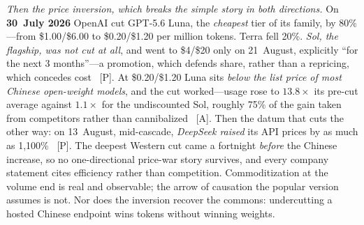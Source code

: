 \emph{Then the price inversion, which breaks the simple story in both directions.} On \textbf{30~July 2026} OpenAI cut GPT-5.6 Luna, the \emph{cheapest} tier of its family, by 80\%---from \$1.00/\$6.00 to \$0.20/\$1.20 per million tokens. Terra fell 20\%. \emph{Sol, the flagship, was not cut at all}, and went to \$4/\$20 only on 21~August, explicitly ``for the next 3 months''---a promotion, which defends share, rather than a repricing, which concedes cost~\cite{openai-luna} [P]. At \$0.20/\$1.20 Luna sits \emph{below the list price of most Chinese open-weight models}, and the cut worked---usage rose to $13.8\times$ its pre-cut average against $1.1\times$ for the undiscounted Sol, roughly 75\% of the gain taken from competitors rather than cannibalized~\cite{price-inversion,openrouter-aug26} [A]. Then the datum that cuts the other way: on 13~August, mid-cascade, \emph{DeepSeek raised} its API prices by as much as 1{,}100\%~\cite{deepseek-raise} [P]. The deepest Western cut came a fortnight \emph{before} the Chinese increase, so no one-directional price-war story survives, and every company statement cites efficiency rather than competition. Commoditization at the volume end is real and observable; the arrow of causation the popular version assumes is not. Nor does the inversion recover the commons: undercutting a hosted Chinese endpoint wins tokens without winning weights.

